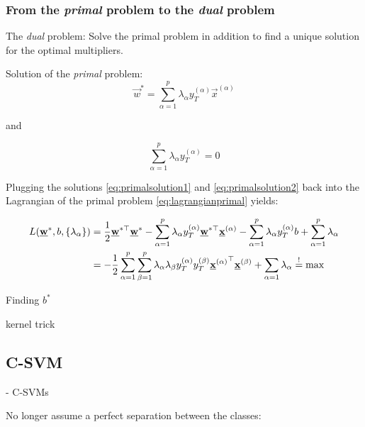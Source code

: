 \begin{frame}\frametitle{From the \emph{primal} problem to the \emph{dual} problem}
    
The \emph{dual} problem: Solve the primal problem in addition to find a unique solution for the optimal multipliers.

Solution of the \emph{primal} problem:
\begin{equation}
 \vec w^{*} = \sum_{\alpha=1}^{p} \lambda_{\alpha} y_{T}^{(\alpha)} \vec x^{(\alpha)}
 \label{eq:primalsolution1}
 \end{equation}

and

\begin{equation}
 \sum_{\alpha=1}^{p} \lambda_{\alpha} y_{T}^{(\alpha)} = 0  
 \label{eq:primalsolution2}
\end{equation}

Plugging the solutions \eqref{eq:primalsolution1} and \eqref{eq:primalsolution2} back into the Lagrangian of the primal problem \eqref{eq:lagrangianprimal} yields:

\begin{align}
L(\underline{\mathbf{w}}^{*}, b, \{\lambda_{\alpha}\}) &= 
\frac{1}{2} \underline{\mathbf{w}}^{*\top} \underline{\mathbf{w}}^{*}
- \sum_{\alpha=1}^{p} \lambda_{\alpha}  y_{T}^{(\alpha)} \underline{\mathbf{w}}^{*\top} \underline{\mathbf{x}}^{(\alpha)}
- \sum_{\alpha=1}^{p} \lambda_{\alpha}  y_{T}^{(\alpha)} b
+ \sum_{\alpha=1}^{p} \lambda_{\alpha}\\
&= -\frac{1}{2} \sum_{\alpha=1}^{p} \sum_{\beta=1}^{p}
\lambda_{\alpha} \lambda_{\beta} y_{T}^{(\alpha)} y_{T}^{(\beta)} {\underline{\mathbf{x}}^{(\alpha)}}^{\top} \underline{\mathbf{x}}^{(\beta)}
+ \sum_{\alpha=1} \lambda_{\alpha} \stackrel{\mathrm{!}}{=} \max
\end{align}

\end{frame}

\begin{frame}
Finding $b^{*}$    
\end{frame}

\begin{frame}


kernel trick
    
\end{frame}

\subsection{C-SVM}

\begin{frame}


- C-SVMs

No longer assume a perfect separation between the classes:

    
\end{frame}
